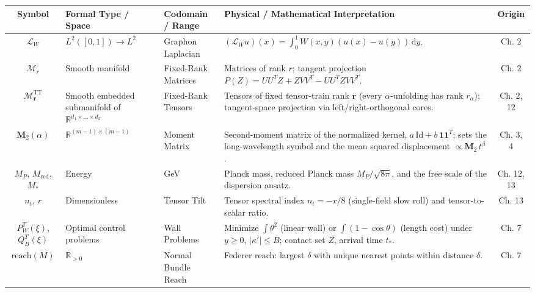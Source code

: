 \documentclass[11pt,a4paper,oneside]{article}
\begin{document}
\begin{table}[!htbp]
\centering
\scriptsize
\renewcommand{\arraystretch}{1.2}
\begin{tabularx}{\textwidth}{@{} c p{3.0cm} p{2.6cm} X c @{}}
\toprule
\textbf{Symbol} & \textbf{Formal Type / Space} & \textbf{Codomain / Range} & \textbf{Physical / Mathematical Interpretation} & \textbf{Origin} \\
\midrule
$\mathcal{L}_W$ & $L^2([0,1]) \to L^2$ & Graphon Laplacian & $(\mathcal{L}_W u)(x) = \int_0^1 W(x,y)(u(x)-u(y))\,\mathrm{d}y$. & Ch. 2 \\
$\mathcal{M}_r$ & Smooth manifold & Fixed-Rank Matrices & Matrices of rank $r$; tangent projection $P(Z) = UU^TZ + ZVV^T - UU^TZVV^T$. & Ch. 2 \\
$\mathcal{M}^{\mathrm{TT}}_{\mathbf{r}}$ & Smooth embedded submanifold of $\mathbb{R}^{d_1 \times \dots \times d_k}$ & Fixed-Rank Tensors & Tensors of fixed tensor-train rank $\mathbf{r}$ (every $\alpha$-unfolding has rank $r_\alpha$); tangent-space projection via left/right-orthogonal cores. & Ch. 2, 12 \\
$\mathbf{M}_2(\alpha)$ & $\mathbb{R}^{(m-1)\times(m-1)}$ & Moment Matrix & Second-moment matrix of the normalized kernel, $a\,\mathrm{Id} + b\,\mathbf{1}\mathbf{1}^T$; sets the long-wavelength symbol and the mean squared displacement $\propto \mathbf{M}_2\,t^\beta$. & Ch. 3, 4 \\
$M_P$, $M_{\mathrm{red}}$, $M_\ast$ & Energy & GeV & Planck mass, reduced Planck mass $M_P/\sqrt{8\pi}$, and the free scale of the dispersion ansatz. & Ch. 12, 13 \\
$n_t$, $r$ & Dimensionless & Tensor Tilt & Tensor spectral index $n_t = -r/8$ (single-field slow roll) and tensor-to-scalar ratio. & Ch. 13 \\
$P_W^T(\xi)$, $Q_B^T(\xi)$ & Optimal control problems & Wall Problems & Minimize $\int\theta^2$ (linear wall) or $\int(1-\cos\theta)$ (length cost) under $y \ge 0$, $|\kappa'| \le B$; contact set $Z$, arrival time $t_*$. & Ch. 7 \\
$\mathrm{reach}(M)$ & $\mathbb{R}_{>0}$ & Normal Bundle Reach & Federer reach: largest $\delta$ with unique nearest points within distance $\delta$. & Ch. 7 \\
\bottomrule
\end{tabularx}
\end{table}
\end{document}
